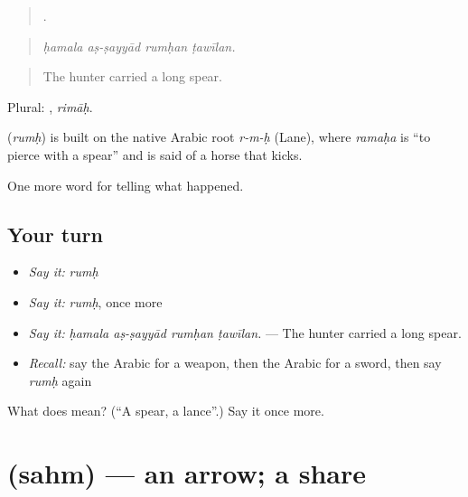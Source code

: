 \begin{quote}
   .
\end{quote}

\begin{quote}
\emph{ḥamala aṣ-ṣayyād rumḥan ṭawīlan.}
\end{quote}

\begin{quote}
The hunter carried a long spear.
\end{quote}

Plural: , \emph{rimāḥ}.

\begin{cousinweb}
\textbf{} (\emph{rumḥ}) is built on the native Arabic root \emph{r-m-ḥ} (Lane), where \emph{ramaḥa} is \textquotedblleft{}to pierce with a spear\textquotedblright{} and is said of a horse that kicks.
\end{cousinweb}

\begin{grammarlens}[title={What you've built}]
One more word for telling what happened.
\end{grammarlens}

\subsection*{Your turn}
\begin{itemize}
\raggedright
  \item \emph{Say it:} \emph{rumḥ}
  \item \emph{Say it:} \emph{rumḥ}, once more
  \item \emph{Say it:} \emph{ḥamala aṣ-ṣayyād rumḥan ṭawīlan.} — The hunter carried a long spear.
  \item \emph{Recall:} say the Arabic for a weapon, then the Arabic for a sword, then say \emph{rumḥ} again
\end{itemize}

\begin{tcolorbox}[breakable,colback=teal!4,colframe=teal!35!black,title={Before you move on}]
What does  mean? (\textquotedblleft{}A spear, a lance\textquotedblright{}.) Say it once more.
\end{tcolorbox}
\section[\texorpdfstring{\ar{سهم} (sahm)}{سهم (sahm)}]{ (sahm) — an arrow; a share}

